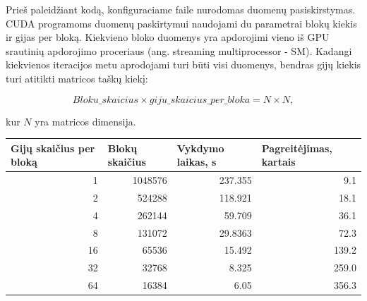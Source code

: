 \documentclass{VUMIFPSbakalaurinis}
\begin{document}
Prieš paleidžiant kodą, konfiguraciame faile nurodomas duomenų pasiskirstymas.
CUDA programoms duomenų paskirtymui naudojami du parametrai blokų kiekis ir gijas per bloką.
Kiekvieno bloko duomenys yra apdorojimi vieno iš GPU srautinių apdorojimo proceriaus (ang. streaming multiprocessor - SM).  
Kadangi kiekvienos iteracijos metu aprodojami turi būti visi duomenys, bendras gijų kiekis turi atitikti matricos taškų kiekį: 

\[ Bloku\_skaicius \times giju\_skaicius\_per\_bloka = N \times N  ,\]

kur $N$ yra matricos dimensija.


\begin{table}[]
    \begin{tabular}{|r|r|r|r|}
        \hline
        \multicolumn{1}{|l|}{Gijų skaičius per bloką} & \multicolumn{1}{l|}{Blokų skaičius} & \multicolumn{1}{l|}{Vykdymo laikas, s} & \multicolumn{1}{l|}{Pagreitėjimas, kartais} \\ \hline
        1                                             & 1048576                             & 237.355                                & 9.1                                         \\ \hline
        2                                             & 524288                              & 118.921                                & 18.1                                        \\ \hline
        4                                             & 262144                              & 59.709                                 & 36.1                                        \\ \hline
        8                                             & 131072                              & 29.8363                                & 72.3                                        \\ \hline
        16                                            & 65536                               & 15.492                                 & 139.2                                       \\ \hline
        32                                            & 32768                               & 8.325                                  & 259.0                                       \\ \hline
        64                                            & 16384                               & 6.05                                   & 356.3                                       \\ \hline

\end{tabular}
\end{table}
\end{document}
